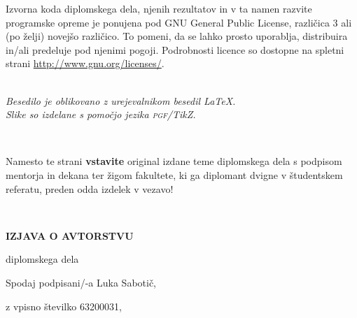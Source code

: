 \documentclass[12pt,a4paper,openany]{book}
\newcommand{\pgfname}{\textsc{pgf}}
\newcommand{\tikzname}{Ti\emph{k}Z}
\begin{document}
\vspace*{1.5cm}
{\small \noindent
Izvorna koda diplomskega dela, njenih rezultatov in v ta namen razvite programske opreme je ponujena pod GNU General Public License,
različica 3 ali (po želji) novejšo različico. To pomeni, da se lahko prosto uporablja, distribuira in/ali predeluje pod njenimi pogoji.
Podrobnosti licence so dostopne na spletni strani \url{http://www.gnu.org/licenses/}.
}

\begin{center} 
\ \\ \vfill
{\em
Besedilo je oblikovano z urejevalnikom besedil \LaTeX. \\ Slike so izdelane s pomočjo jezika \pgfname/\tikzname.}
\end{center}

\newpage

\ \thispagestyle{empty}

\newpage


\thispagestyle{empty}

Namesto te strani {\bf vstavite} original izdane teme diplomskega dela s podpisom mentorja in dekana ter \v zigom fakultete, ki ga diplomant
dvigne v študent\-skem referatu,  preden odda izdelek v vezavo!

\newpage


\ \thispagestyle{empty}

\newpage



\thispagestyle{empty}

\vspace{1cm}
\begin{center} 
{\Large \textbf{IZJAVA O AVTORSTVU}}
\end{center}

\begin{center} 
{\Large diplomskega dela}
\end{center}

\vspace{1cm}
Spodaj podpisani/-a \hspace{0.5cm} Luka Sabotič,

\vspace{0.5cm}
z vpisno številko \hspace{0.5cm} 63200031,
\end{document}
